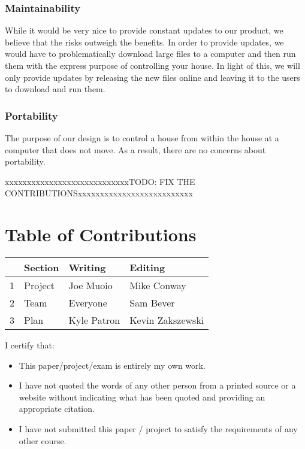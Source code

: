 \documentclass{article}
\begin{document}
\subsubsection{Maintainability}
While it would be very nice to provide constant updates to our product, we believe that the risks outweigh the benefits. In order to provide updates, we would have to problematically download large files to a computer and then run them with the express purpose of controlling your house. In light of this, we will only provide updates by releasing the new files online and leaving it to the users to download and run them.

\subsubsection{Portability}
The purpose of our design is to control a house from within the house at a computer that does not move. As a result, there are no concerns about portability.



\newpage
{\color{red}xxxxxxxxxxxxxxxxxxxxxxxxxxxxTODO: FIX THE CONTRIBUTIONSxxxxxxxxxxxxxxxxxxxxxxxxxx}
\section*{\centering Table of Contributions}
\begin{tabular}{| l | l | l | l |}
    \hline
     & Section & Writing & Editing \\
    \hline \hline
    1 & Project & Joe Muoio  & Mike Conway \\ \hline
    2 & Team & Everyone & Sam Bever \\ \hline
    3 & Plan & Kyle Patron & Kevin Zakszewski \\ \hline
\end{tabular}
\newpage
\noindent I certify that:
\begin{itemize}
\item This paper/project/exam is entirely my own work.
\item I have not quoted the words of any other person from a printed source or a website without indicating what has been quoted and providing an appropriate citation.
\item I have not submitted this paper / project to satisfy the requirements of any other course.
\end{itemize}

\vspace{1cm}
\noindent{}
\end{document}
